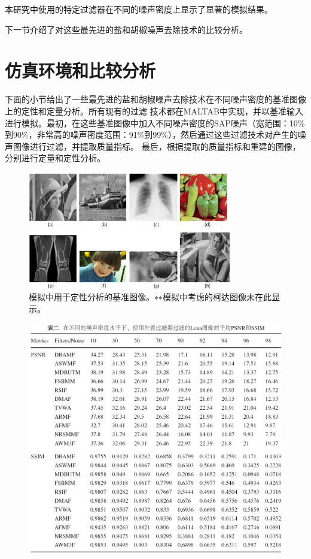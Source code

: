 \documentclass[12pt]{article} %
\begin{document}
本研究中使用的特定过滤器在不同的噪声密度上显示了显著的模拟结果。

下一节介绍了对这些最先进的盐和胡椒噪声去除技术的比较分析。

\section{仿真环境和比较分析\label{sec:4}}
下面的小节给出了一些最先进的盐和胡椒噪声去除技术在不同噪声密度的基准图像上的定性和定量分析。所有现有的过滤
技术都在MALTAB中实现，并以基准输入进行模拟。最初，在这些基准图像中加入不同噪声密度的SAP噪声（宽范围：10\%
到90\%，非常高的噪声密度范围：91\%到99\%），然后通过这些过滤技术对产生的噪声图像进行过滤，并提取质量指标。
最后，根据提取的质量指标和重建的图像，分别进行定量和定性分析。

\begin{figure}[H]
    \centering
    \includegraphics[width=0.8\textwidth]{images/04.eps}    
    \caption{模拟中用于定性分析的基准图像。∗∗模拟中考虑的柯达图像未在此显示。}
\end{figure}
\begin{figure}[H]
    \centering
    \includegraphics[width=1\textwidth]{images/03.eps}    
\end{figure}
\end{document}
